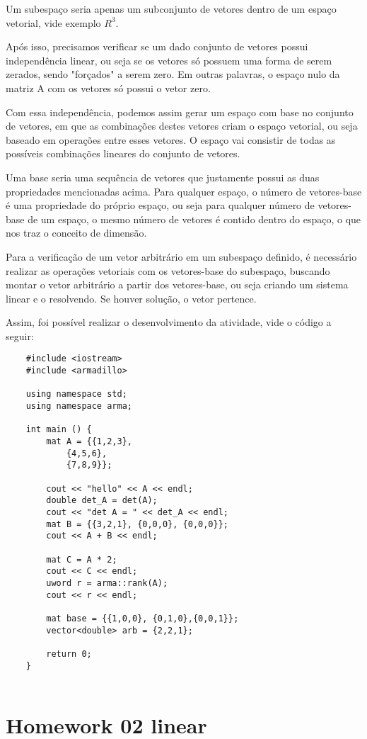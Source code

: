 Um subespaço seria apenas um subconjunto de vetores dentro de um espaço vetorial, vide exemplo $R^3$.

Após isso, precisamos verificar se um dado conjunto de vetores possui independência linear, ou seja se os vetores só possuem uma forma de serem zerados, sendo "forçados" a serem zero. Em outras palavras, o espaço nulo da matriz A com os vetores só possui o vetor zero.

Com essa independência, podemos assim gerar um espaço com base no conjunto de vetores, em que as combinações destes vetores criam o espaço vetorial, ou seja baseado em operações entre esses vetores. O espaço vai consistir de todas as possíveis combinações lineares do conjunto de vetores. 

Uma base seria uma sequência de vetores que justamente possui as duas propriedades mencionadas acima. Para qualquer espaço, o número de vetores-base é uma propriedade do próprio espaço, ou seja para qualquer número de vetores-base de um espaço, o mesmo número de vetores é contido dentro do espaço, o que nos traz o conceito de dimensão. 

Para a verificação de um vetor arbitrário em um subespaço definido, é necessário realizar as operações vetoriais com os vetores-base do subespaço, buscando montar o vetor arbitrário a partir dos vetores-base, ou seja criando um sistema linear e o resolvendo. Se houver solução, o vetor pertence. 

Assim, foi possível realizar o desenvolvimento da atividade, vide o código a seguir: 

\begin{lstlisting}
	#include <iostream>
	#include <armadillo>
	
	using namespace std;
	using namespace arma;
	
	int main () {
		mat A = {{1,2,3},
			{4,5,6},
			{7,8,9}};
		
		cout << "hello" << A << endl;
		double det_A = det(A);
		cout << "det A = " << det_A << endl;
		mat B = {{3,2,1}, {0,0,0}, {0,0,0}};
		cout << A + B << endl;
		
		mat C = A * 2;
		cout << C << endl; 
		uword r = arma::rank(A);
		cout << r << endl;
		
		mat base = {{1,0,0}, {0,1,0},{0,0,1}};
		vector<double> arb = {2,2,1};
		
		return 0;
	}
	
\end{lstlisting}

\section{Homework 02 linear}


